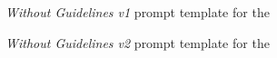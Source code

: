 \clearpage

\begin{figure}[H]
    \centering
    \caption{\textit{Without Guidelines v1} prompt template for the \judgemodels}
    \label{app:WithoutGuidelines_v1}
\end{figure}

\begin{figure}[t]
    \centering
    \caption{\textit{Without Guidelines v2} prompt template for the \judgemodels}
    \label{app:WithoutGuidelines_v2}
\end{figure}

